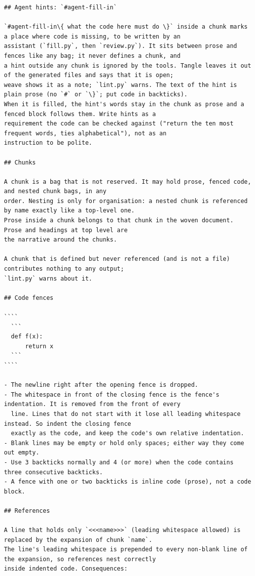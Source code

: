 \documentclass[10pt,a4paper]{article}
\newcounter{chunk}
\begin{document}
\begin{Verbatim}
## Agent hints: `#agent-fill-in`

`#agent-fill-in\{ what the code here must do \}` inside a chunk marks a place where code is missing, to be written by an
assistant (`fill.py`, then `review.py`). It sits between prose and fences like any bag; it never defines a chunk, and
a hint outside any chunk is ignored by the tools. Tangle leaves it out of the generated files and says that it is open;
weave shows it as a note; `lint.py` warns. The text of the hint is plain prose (no `#` or `\}`; put code in backticks).
When it is filled, the hint's words stay in the chunk as prose and a fenced block follows them. Write hints as a
requirement the code can be checked against ("return the ten most frequent words, ties alphabetical"), not as an
instruction to be polite.

## Chunks

A chunk is a bag that is not reserved. It may hold prose, fenced code, and nested chunk bags, in any
order. Nesting is only for organisation: a nested chunk is referenced by name exactly like a top-level one.
Prose inside a chunk belongs to that chunk in the woven document. Prose and headings at top level are
the narrative around the chunks.

A chunk that is defined but never referenced (and is not a file) contributes nothing to any output;
`lint.py` warns about it.

## Code fences

````
  ```
  def f(x):
      return x
  ```
````

- The newline right after the opening fence is dropped.
- The whitespace in front of the closing fence is the fence's indentation. It is removed from the front of every
  line. Lines that do not start with it lose all leading whitespace instead. So indent the closing fence
  exactly as the code, and keep the code's own relative indentation.
- Blank lines may be empty or hold only spaces; either way they come out empty.
- Use 3 backticks normally and 4 (or more) when the code contains three consecutive backticks.
- A fence with one or two backticks is inline code (prose), not a code block.

## References

A line that holds only `<<<name>>>` (leading whitespace allowed) is replaced by the expansion of chunk `name`.
The line's leading whitespace is prepended to every non-blank line of the expansion, so references nest correctly
inside indented code. Consequences:


\end{Verbatim}
\end{document}
